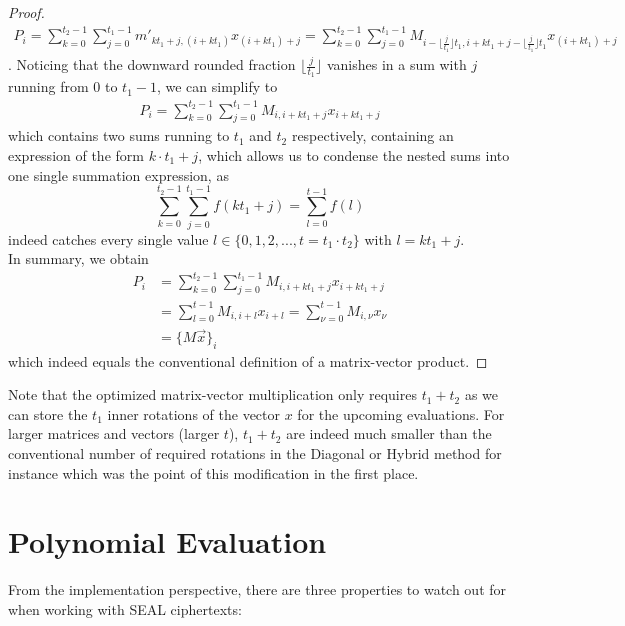 \begin{proof}
\begin{align*}
    P_i = \sum_{k=0}^{t_2-1} \sum_{j=0}^{t_1-1} m'_{kt_1+j,(i+kt_1)} x_{(i+kt_1)+j}
    = \sum_{k=0}^{t_2-1} \sum_{j=0}^{t_1-1} M_{i-\lfloor\frac{j}{t_1}\rfloor t_1, i+kt_1+j-\lfloor\frac{j}{t_1}\rfloor t_1} x_{(i+kt_1)+j}
  \end{align*}
  . Noticing that the downward rounded fraction $\lfloor\frac{j}{t_1}\rfloor$ vanishes
  in a sum with $j$ running from $0$ to $t_1-1$, we can simplify to
  \begin{align*}
    P_i = \sum_{k=0}^{t_2-1} \sum_{j=0}^{t_1-1} M_{i,i+kt_1+j} x_{i+kt_1+j}
  \end{align*}
  which contains two sums running to $t_1$ and $t_2$ respectively, containing an expression of the form $k \cdot t_1 + j$, which allows us to condense the nested sums into one single summation expression, as $$\sum_{k=0}^{t_2-1} \sum_{j=0}^{t_1-1} f(kt_1+j) = \sum_{l=0}^{t-1} f(l)$$ indeed catches every single value $l \in \{0, 1, 2, ..., t=t_1 \cdot t_2\}$ with $l = kt_1+j$. \\
  In summary, we obtain
  \begin{align*}
    P_i & = \sum_{k=0}^{t_2-1} \sum_{j=0}^{t_1-1} M_{i,i+kt_1+j} x_{i+kt_1+j} \\
        & = \sum_{l=0}^{t-1} M_{i,i+l} x_{i+l}
    = \sum_{\nu=0}^{t-1} M_{i,\nu} x_{\nu}                                    \\
        & = \big\{M \vec{x}\big\}_i
  \end{align*}
  which indeed equals the conventional definition of a matrix-vector product.
\end{proof}

Note that the optimized matrix-vector multiplication only requires $t_1 + t_2$ as we can store the $t_1$ inner rotations of the vector $x$ for the upcoming evaluations.
For larger matrices and vectors (larger $t$), $t_1 + t_2$ are indeed much smaller than the conventional number of required rotations in the Diagonal or Hybrid method for instance which was the point of this modification in the first place.

\section{Polynomial Evaluation}
From the implementation perspective, there are three properties to watch out for when working with SEAL ciphertexts:

